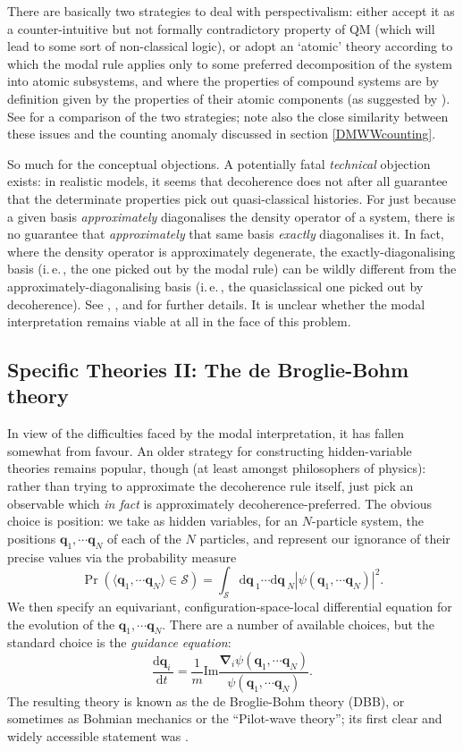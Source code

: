\documentclass[12pt]{article}
\newcommand{\iec}{\mbox{i.\,e.\,}}
\newcommand{\be}{\begin{equation}}
\newcommand{\ee}{\end{equation}}
\newcommand{\vctr}[1]{\ensuremath{\mathbf{ #1 }}}
\newcommand{\dr}[1]{\ensuremath{\mathrm{d} #1\,}}
\newcommand{\mc}[1]{\ensuremath{\mathcal{#1}}}
\newcommand{\dbd}[2]{\ensuremath{\frac{\dr{#1}}{\dr{#2}}}}
\begin{document}
There are basically two strategies to deal with perspectivalism: either accept it as a counter-intuitive but not formally contradictory property of QM (which will lead to some sort of  non-classical logic), or adopt an `atomic' theory according to which the modal rule applies only to some preferred decomposition of the system into atomic subsystems, and where the properties of compound systems are by definition given by the properties of their atomic components (as suggested by ). See  for a comparison of the two strategies; note also the close similarity between these issues and the counting anomaly discussed in section \ref{DMWWcounting}.

So much for the conceptual objections. A potentially fatal \emph{technical} objection exists: in realistic models, it seems that decoherence does not after all guarantee that the determinate properties pick out quasi-classical histories. For just because a given basis \emph{approximately} diagonalises the density operator of a system, there is no guarantee that \emph{approximately} that same basis \emph{exactly} diagonalises it. In fact, where the density operator is approximately degenerate, the exactly-diagonalising basis (\iec, the one picked out by the modal rule) can be wildly different from the approximately-diagonalising basis (\iec, the quasiclassical one picked out by decoherence). See , , and  for further details. It is unclear whether the modal interpretation remains viable at all in the face of this problem.

\subsection{Specific Theories II: The de Broglie-Bohm theory}

In view of the difficulties faced by the modal interpretation, it has fallen somewhat from favour. An older strategy for constructing hidden-variable theories remains popular, though (at least amongst philosophers of physics): rather than trying to approximate the decoherence rule itself, just pick an observable which \emph{in fact} is approximately decoherence-preferred. The obvious choice is position: we take as hidden variables, for an $N$-particle system, the positions $\vctr{q}_1, \cdots \vctr{q}_N$ of each of the $N$ particles, and represent our ignorance of their precise values via the probability measure
\be
\Pr(\langle \vctr{q}_1, \cdots \vctr{q}_N\rangle\in \mc{S})=\int_\mc{S}\dr{\vctr{q}}_1 \cdots \dr{\vctr{q}}_N |\psi(\vctr{q}_1, \cdots \vctr{q}_N)|^2.
\ee
 We then specify an equivariant, configuration-space-local differential equation for the evolution of the $\vctr{q}_1, \cdots \vctr{q}_N$. There are a number of available choices, but the standard choice is the \emph{guidance equation}:
\be
\dbd{\vctr{q}_i}{t}=\frac{1}{m}\mathrm{Im} \frac{\vctr{\nabla}_i \psi (\vctr{q}_1, \cdots \vctr{q}_N)}{\psi(\vctr{q}_1, \cdots \vctr{q}_N)}.
\ee
The resulting theory is known as the de Broglie-Bohm theory (DBB), or sometimes as Bohmian mechanics or the ``Pilot-wave theory''; its first clear and widely accessible statement was .
\end{document}
